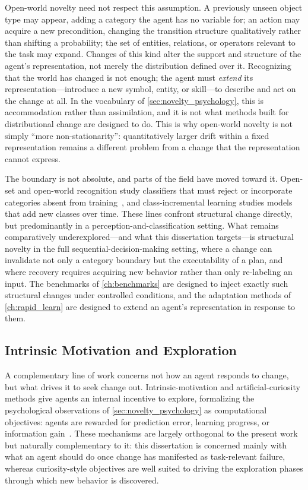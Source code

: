 Open-world novelty need not respect this assumption. A previously unseen object type may appear, adding a category the agent has no variable for; an action may acquire a new precondition, changing the transition structure qualitatively rather than shifting a probability; the set of entities, relations, or operators relevant to the task may expand. Changes of this kind alter the support and structure of the agent's representation, not merely the distribution defined over it. Recognizing that the world has changed is not enough; the agent must \emph{extend} its representation---introduce a new symbol, entity, or skill---to describe and act on the change at all. In the vocabulary of \cref{sec:novelty_psychology}, this is accommodation rather than assimilation, and it is not what methods built for distributional change are designed to do. This is why open-world novelty is not simply ``more non-stationarity'': quantitatively larger drift within a fixed representation remains a different problem from a change that the representation cannot express.

The boundary is not absolute, and parts of the field have moved toward it. Open-set and open-world recognition study classifiers that must reject or incorporate categories absent from training~\citep{boult2021towards}, and class-incremental learning studies models that add new classes over time. These lines confront structural change directly, but predominantly in a perception-and-classification setting. What remains comparatively underexplored---and what this dissertation targets---is structural novelty in the full sequential-decision-making setting, where a change can invalidate not only a category boundary but the executability of a plan, and where recovery requires acquiring new behavior rather than only re-labeling an input. The benchmarks of \cref{ch:benchmarks} are designed to inject exactly such structural changes under controlled conditions, and the adaptation methods of \cref{ch:rapid_learn} are designed to extend an agent's representation in response to them.

\subsection{Intrinsic Motivation and Exploration}
\label{sec:intrinsic_motivation}

A complementary line of work concerns not how an agent responds to change, but what drives it to seek change out. Intrinsic-motivation and artificial-curiosity methods give agents an internal incentive to explore, formalizing the psychological observations of \cref{sec:novelty_psychology} as computational objectives: agents are rewarded for prediction error, learning progress, or information gain~\citep{schmidhuber1991curious, oudeyer2007intrinsic, pathak2017curiosity}. These mechanisms are largely orthogonal to the present work but naturally complementary to it: this dissertation is concerned mainly with what an agent should do once change has manifested as task-relevant failure, whereas curiosity-style objectives are well suited to driving the exploration phases through which new behavior is discovered.

